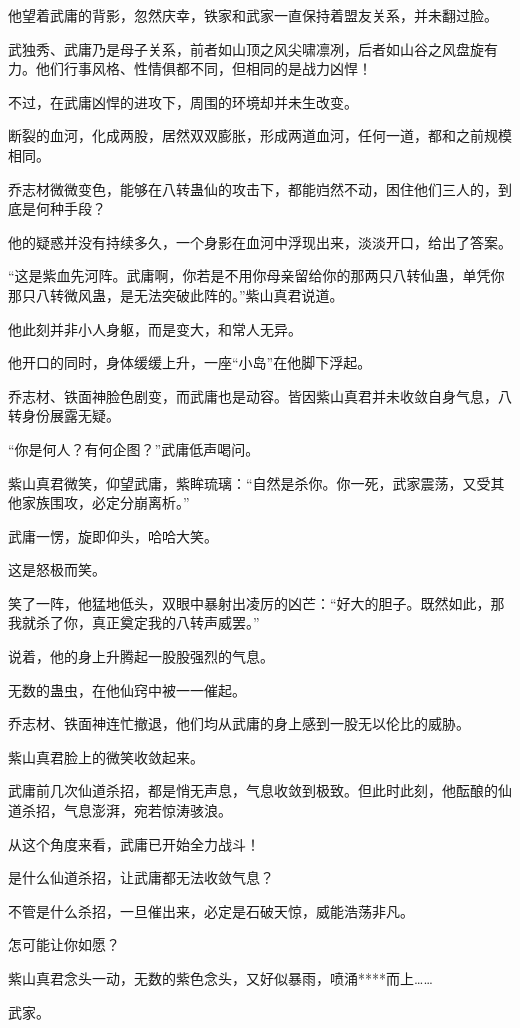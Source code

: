 \begin{this_body}
他望着武庸的背影，忽然庆幸，铁家和武家一直保持着盟友关系，并未翻过脸。

武独秀、武庸乃是母子关系，前者如山顶之风尖啸凛冽，后者如山谷之风盘旋有力。他们行事风格、性情俱都不同，但相同的是战力凶悍！

不过，在武庸凶悍的进攻下，周围的环境却并未生改变。

断裂的血河，化成两股，居然双双膨胀，形成两道血河，任何一道，都和之前规模相同。

乔志材微微变色，能够在八转蛊仙的攻击下，都能岿然不动，困住他们三人的，到底是何种手段？

他的疑惑并没有持续多久，一个身影在血河中浮现出来，淡淡开口，给出了答案。

“这是紫血先河阵。武庸啊，你若是不用你母亲留给你的那两只八转仙蛊，单凭你那只八转微风蛊，是无法突破此阵的。”紫山真君说道。

他此刻并非小人身躯，而是变大，和常人无异。

他开口的同时，身体缓缓上升，一座“小岛”在他脚下浮起。

乔志材、铁面神脸色剧变，而武庸也是动容。皆因紫山真君并未收敛自身气息，八转身份展露无疑。

“你是何人？有何企图？”武庸低声喝问。

紫山真君微笑，仰望武庸，紫眸琉璃：“自然是杀你。你一死，武家震荡，又受其他家族围攻，必定分崩离析。”

武庸一愣，旋即仰头，哈哈大笑。

这是怒极而笑。

笑了一阵，他猛地低头，双眼中暴射出凌厉的凶芒：“好大的胆子。既然如此，那我就杀了你，真正奠定我的八转声威罢。”

说着，他的身上升腾起一股股强烈的气息。

无数的蛊虫，在他仙窍中被一一催起。

乔志材、铁面神连忙撤退，他们均从武庸的身上感到一股无以伦比的威胁。

紫山真君脸上的微笑收敛起来。

武庸前几次仙道杀招，都是悄无声息，气息收敛到极致。但此时此刻，他酝酿的仙道杀招，气息澎湃，宛若惊涛骇浪。

从这个角度来看，武庸已开始全力战斗！

是什么仙道杀招，让武庸都无法收敛气息？

不管是什么杀招，一旦催出来，必定是石破天惊，威能浩荡非凡。

怎可能让你如愿？

紫山真君念头一动，无数的紫色念头，又好似暴雨，喷涌****而上……

武家。


\end{this_body}
